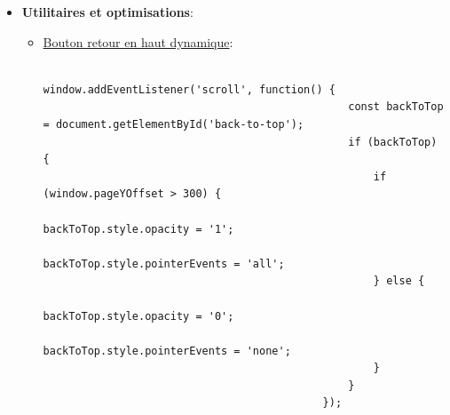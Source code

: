 \documentclass[a4paper,11pt]{article}
\begin{document}
\begin{itemize}
                        \item \textbf{Utilitaires et optimisations}:
                            \begin{itemize}
                                \item \underline{Bouton retour en haut dynamique}:
                                    \begin{tcolorbox}[colback=lightgray!5, colframe=gray!80, left=-70mm, right=5mm, top=2mm, bottom=0mm, boxrule=0.1mm]
                                        \begin{verbatim}
                                            window.addEventListener('scroll', function() {
                                                const backToTop = document.getElementById('back-to-top');
                                                if (backToTop) {
                                                    if (window.pageYOffset > 300) {
                                                        backToTop.style.opacity = '1';
                                                        backToTop.style.pointerEvents = 'all';
                                                    } else {
                                                        backToTop.style.opacity = '0';
                                                        backToTop.style.pointerEvents = 'none';
                                                    }
                                                }
                                            });
                                        \end{verbatim}
                                    \end{tcolorbox}


\end{itemize}
\end{itemize}
\end{document}
